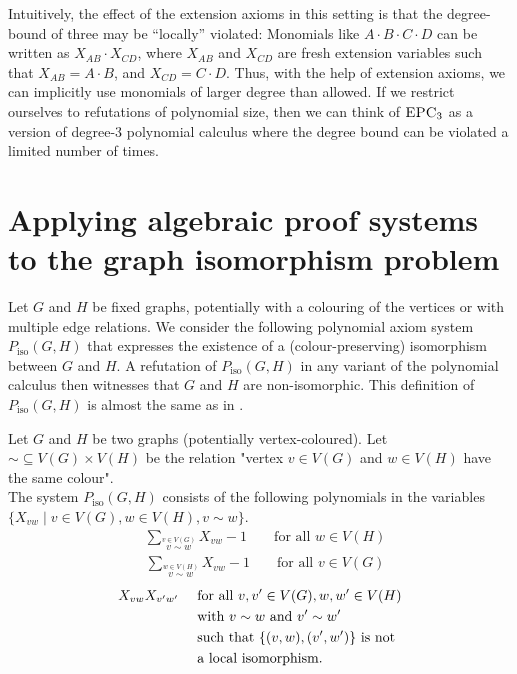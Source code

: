 \documentclass[a4paper,UKenglish,cleveref, autoref, thm-restate]{lipics-v2021}
\newcommand{\EPC}{\mbox{\sc EPC}}
\newcommand{\Piso}{P_{\text{iso}}}
\begin{document}
	Intuitively, the effect of the extension axioms in this setting is that the degree-bound of three may be ``locally'' violated: Monomials like $A \cdot B \cdot C \cdot D$ can be written as $X_{AB} \cdot X_{CD}$, where $X_{AB}$ and $X_{CD}$ are fresh extension variables such that $X_{AB} = A \cdot B$, and $X_{CD} = C \cdot D$. Thus, with the help of extension axioms, we can implicitly use monomials of larger degree than allowed. If we restrict ourselves to refutations of polynomial size, then we can think of $\EPC_3$ as a version of degree-$3$ polynomial calculus where the degree bound can be violated a limited number of times.
	
	
	\section{Applying algebraic proof systems to the graph isomorphism problem}
	\label{sec:PC_groheBerkholz}
	Let $G$ and $H$ be fixed graphs, potentially with a colouring of the vertices or with multiple edge relations. We consider the following polynomial axiom system $\Piso(G,H)$ that expresses the existence of a (colour-preserving) isomorphism between $G$ and $H$. A refutation of $\Piso(G,H)$ in any variant of the polynomial calculus then witnesses that $G$ and $H$ are non-isomorphic.
	This definition of $\Piso(G,H)$ is almost the same as in \cite{berkholz}.
	\begin{definition}
		\label{def:PC_isoSystem}
		Let $G$ and $H$ be two graphs (potentially vertex-coloured). Let $\sim \subseteq V(G) \times V(H)$ be the relation "vertex $v \in V(G)$ and $w \in V(H)$ have the same colour".\\
		The system $\Piso(G,H)$ consists of the following polynomials in the variables $\{X_{vw} \mid v \in V(G), w \in V(H), v \sim w\}$.
		\begin{align}
			\label{isoAxiom1}
			&\sum_{\stackrel{v \in V(G)}{v \sim w}} X_{vw} - 1 & &\text{ for all } w \in V(H)
		\end{align}
		\begin{align}
			\label{isoAxiom2}
			&\sum_{\stackrel{w \in V(H)}{v \sim w}} X_{vw} - 1 & &\text{ for all } v \in V(G)
		\end{align}
		\begin{align}
			\label{isoAxiom3}
			&X_{vw}X_{v'w'} & &\text{ for all } v,v' \in V(G), w,w' \in V(H)\\
			& & &\text{ with } v \sim w \text{ and } v' \sim w' \notag\\ 
			& & &\text{ such that } \{(v,w),(v',w')\} \text{ is not} \notag\\
			& & & \text{ a local isomorphism.} \notag
		\end{align}
	\end{definition}
\end{document}
